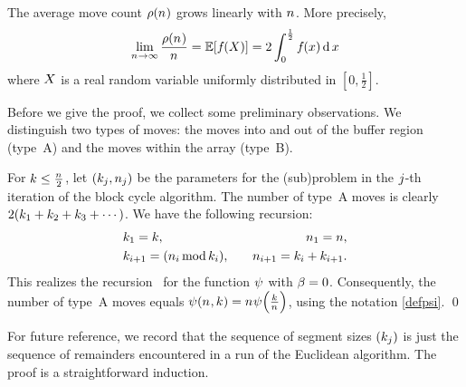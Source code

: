   \begin{theorem}\label{thm.limit}
    The average move count $\AvgCostOf{\Size}$ grows linearly with $\Size$.
    More precisely,
    \[
      \lim_{\Size\rightarrow\infty}
      \frac{\AvgCostOf{\Size}}{\Size}
      =
      \ExpValOf{ \RelCostOf{\RndVariable} }
      =
      2\int_0^{\frac12} \RelCostOf{\TheVariable} \diff \TheVariable
    \]
    where  $\RndVariable$ is a real random variable uniformly
    distributed in $[0,\frac12]$.
  \end{theorem}
  Before we give the proof, we collect some preliminary observations. 
 We distinguish two types of moves: the moves into and out of the
  buffer region (type~A) and the moves within the array (type~B).
  \begin{observation}\label{obs.typeA}
    For $\Shift\leq\frac{\Size}{2}$, let $(\Shift[\TheIndex],\Size[\TheIndex])$ be
    the parameters for the (sub)problem in the $\TheIndex$-th iteration of the block
    cycle algorithm. 
    The number of type~A moves is clearly
    \(
      2(\Shift[1] + \Shift[2] + \Shift[3] + \cdots)
    \).
    We have the following recursion:
    \begin{align*}
      & k_1 = k, \quad &n_1 = n, \\
      & k_{i+1} = \inm{n_i}{k_i}, \quad & n_{i+1} = k_i + k_{i+1}.
    \end{align*}
    This realizes the recursion~ for the function $\EssentialCost$ with
    $\BufLength=0$.
    Consequently, the number of type~A moves equals
    \(
      \EssentialCostOf{\Size,\Shift}
      =
      \Size\EssentialCostOf{\frac{\Shift}{\Size}}
    \), using the notation \eqref{defpsi}. \qed    
  \end{observation}
  For future reference, we record that the sequence of segment sizes $(\Shift[\TheIndex])$
  is just the sequence of remainders encountered in a run of the Euclidean algorithm. The proof is a straightforward induction. 
